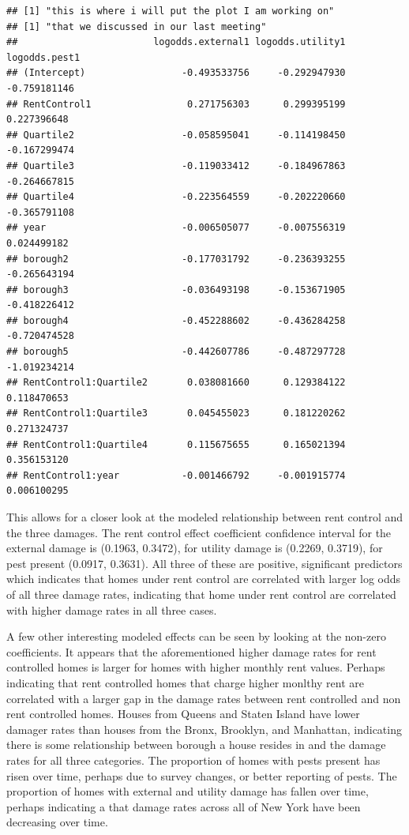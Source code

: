 \documentclass[11pt]{asaproc}\usepackage[]{graphicx}\usepackage[]{color}
\makeatletter
\newenvironment{kframe}{%
 \def\at@end@of@kframe{}%
 \ifinner\ifhmode%
  \def\at@end@of@kframe{\end{minipage}}%
  \begin{minipage}{\columnwidth}%
 \fi\fi%
 \def\FrameCommand##1{\hskip\@totalleftmargin \hskip-\fboxsep
 \colorbox{shadecolor}{##1}\hskip-\fboxsep
     \hskip-\linewidth \hskip-\@totalleftmargin \hskip\columnwidth}%
 \MakeFramed {\advance\hsize-\width
   \@totalleftmargin\z@ \linewidth\hsize
   \@setminipage}}%
 {\par\unskip\endMakeFramed%
 \at@end@of@kframe}
\newenvironment{knitrout}{}{} %
\makeatother
\begin{document}
\begin{knitrout}
\color{fgcolor}\begin{kframe}
\begin{verbatim}
## [1] "this is where i will put the plot I am working on"
## [1] "that we discussed in our last meeting"
##                        logodds.external1 logodds.utility1 logodds.pest1
## (Intercept)                 -0.493533756     -0.292947930  -0.759181146
## RentControl1                 0.271756303      0.299395199   0.227396648
## Quartile2                   -0.058595041     -0.114198450  -0.167299474
## Quartile3                   -0.119033412     -0.184967863  -0.264667815
## Quartile4                   -0.223564559     -0.202220660  -0.365791108
## year                        -0.006505077     -0.007556319   0.024499182
## borough2                    -0.177031792     -0.236393255  -0.265643194
## borough3                    -0.036493198     -0.153671905  -0.418226412
## borough4                    -0.452288602     -0.436284258  -0.720474528
## borough5                    -0.442607786     -0.487297728  -1.019234214
## RentControl1:Quartile2       0.038081660      0.129384122   0.118470653
## RentControl1:Quartile3       0.045455023      0.181220262   0.271324737
## RentControl1:Quartile4       0.115675655      0.165021394   0.356153120
## RentControl1:year           -0.001466792     -0.001915774   0.006100295
\end{verbatim}
\end{kframe}
\end{knitrout}


This allows for a closer look at the modeled relationship between rent control and the three damages. The rent control effect coefficient confidence interval for the external damage is (0.1963, 0.3472), for utility damage is (0.2269, 0.3719), for pest present (0.0917, 0.3631). All three of these are positive, significant predictors which indicates that homes under rent control are correlated with larger log odds of all three damage rates, indicating that home under rent control are correlated with higher damage rates in all three cases.

A few other interesting modeled effects can be seen by looking at the non-zero coefficients. It appears that the aforementioned higher damage rates for rent controlled homes is larger for homes with higher monthly rent values. Perhaps indicating that rent controlled homes that charge higher monlthy rent are correlated with a larger gap in the damage rates between rent controlled and non rent controlled homes. Houses from Queens and Staten Island have lower damager rates than houses from the Bronx, Brooklyn, and Manhattan, indicating there is some relationship between borough a house resides in and the damage rates for all three categories. The proportion of homes with pests present has risen over time, perhaps due to survey changes, or better reporting of pests. The proportion of homes with external and utility damage has fallen over time, perhaps indicating a that damage rates across all of New York have been decreasing over time.
\end{document}
